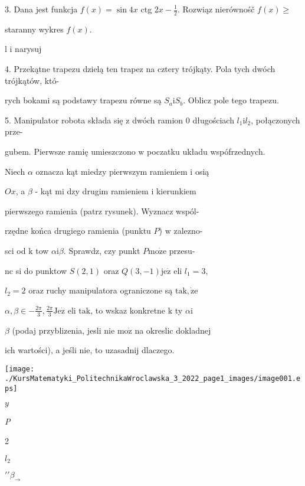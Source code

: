 \documentclass[a4paper,12pt]{article}
\begin{document}
3. Dana jest funkcja $f(x) = \sin 4x$ ctg $2x-\displaystyle \frac{1}{2}$. Rozwiąz nierównośč $f(x) \geq$

staranny wykres $f(x).$

l i narysuj

4. Przekątne trapezu dzielą ten trapez na cztery trójkąty. Pola tych dwóch trójkątów, któ-

rych bokami są podstawy trapezu równe są $S_{a}\mathrm{i}S_{b}$. Oblicz pole tego trapezu.

5. Manipulator robota składa się $\mathrm{z}$ dwóch ramion $0$ długościach $l_{1}\mathrm{i}l_{2}$, połączonych prze-

gubem. Pierwsze ramię umieszczono $\mathrm{w}$ poczatku układu wspófrzednych.

Niech $\alpha$ oznacza kąt miedzy pierwszym ramieniem $\mathrm{i}$ osią

$Ox$, a $\beta$ - kąt mi dzy drugim ramieniem $\mathrm{i}$ kierunkiem

pierwszego ramienia (patrz rysunek). Wyznacz wspól-

rzędne końca drugiego ramienia (punktu $P$) $\mathrm{w}$ zalezno-

sci od $\mathrm{k}$ tow $\alpha \mathrm{i}\beta$. Sprawdz, czy punkt $P\mathrm{m}\mathrm{o}\dot{\mathrm{z}}\mathrm{e}$ przesu-

$\mathrm{n} \mathrm{c}$ si do punktow $S(2,1)$ oraz $Q(3,-1)\mathrm{j}\mathrm{e}\dot{\mathrm{z}}$ eli $l_{1} =3,$

$l_{2} = 2$ oraz ruchy manipulatora ograniczone są $\mathrm{t}\mathrm{a}\mathrm{k}, \dot{\mathrm{z}}\mathrm{e}$

$\alpha, \beta\in -\displaystyle \frac{2\pi}{3}, \displaystyle \frac{2\pi}{3} \mathrm{J}\mathrm{e}\dot{\mathrm{z}}$ eli $\mathrm{t}\mathrm{a}\mathrm{k}$, to wskaz konkretne $\mathrm{k}$ ty $\alpha \mathrm{i}$

$\beta$ (podaj przyblizenia, jesli nie $\mathrm{m}\mathrm{o}\dot{\mathrm{z}}$ na okreslic dokladnej

ich wartości), a jeśli $\mathrm{n}\mathrm{i}\mathrm{e}$, to uzasadnij dlaczego.
\begin{center}
\texttt{[image: ./KursMatematyki\_PolitechnikaWroclawska\_3\_2022\_page1\_images/image001.eps]}
\end{center}
$y$

{\it P}

2

$l_{2}$

$\prime\prime\beta_{\rightarrow}$
\end{document}
